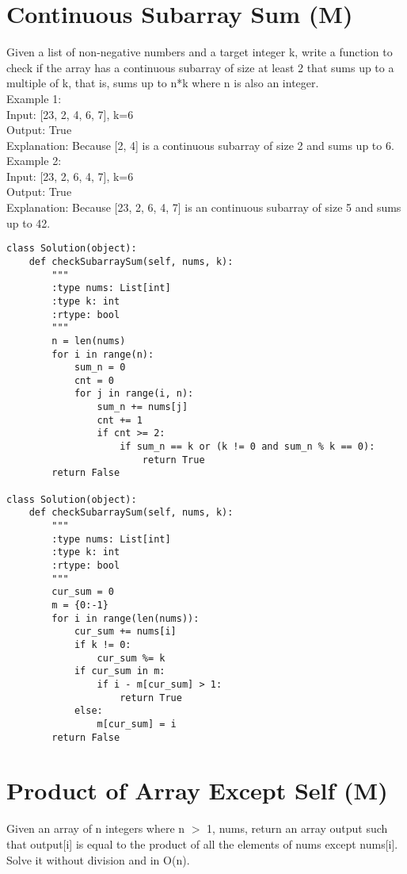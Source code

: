 \section{Continuous Subarray Sum (M)}
Given a list of non-negative numbers and a target integer k, write a function to check if the array has a continuous subarray of size at least 2 that sums up to a multiple of k, that is, sums up to n*k where n is also an integer.\\

Example 1:\\
Input: [23, 2, 4, 6, 7],  k=6\\
Output: True\\
Explanation: Because [2, 4] is a continuous subarray of size 2 and sums up to 6.\\

Example 2:\\
Input: [23, 2, 6, 4, 7],  k=6\\
Output: True\\
Explanation: Because [23, 2, 6, 4, 7] is an continuous subarray of size 5 and sums up to 42.\\

\begin{lstlisting}
class Solution(object):
    def checkSubarraySum(self, nums, k):
        """
        :type nums: List[int]
        :type k: int
        :rtype: bool
        """
        n = len(nums)
        for i in range(n):
            sum_n = 0
            cnt = 0
            for j in range(i, n):
                sum_n += nums[j]
                cnt += 1
                if cnt >= 2:
                    if sum_n == k or (k != 0 and sum_n % k == 0): 
                        return True
        return False
    
class Solution(object):
    def checkSubarraySum(self, nums, k):
        """
        :type nums: List[int]
        :type k: int
        :rtype: bool
        """    
        cur_sum = 0
        m = {0:-1}
        for i in range(len(nums)):
            cur_sum += nums[i]
            if k != 0:
                cur_sum %= k
            if cur_sum in m:
                if i - m[cur_sum] > 1:
                    return True
            else:
                m[cur_sum] = i
        return False
\end{lstlisting}

\section{Product of Array Except Self (M)}
Given an array of n integers where n $>$ 1, nums, return an array output such that output[i] is equal to the product of all the elements of nums except nums[i]. Solve it without division and in O(n). \\


